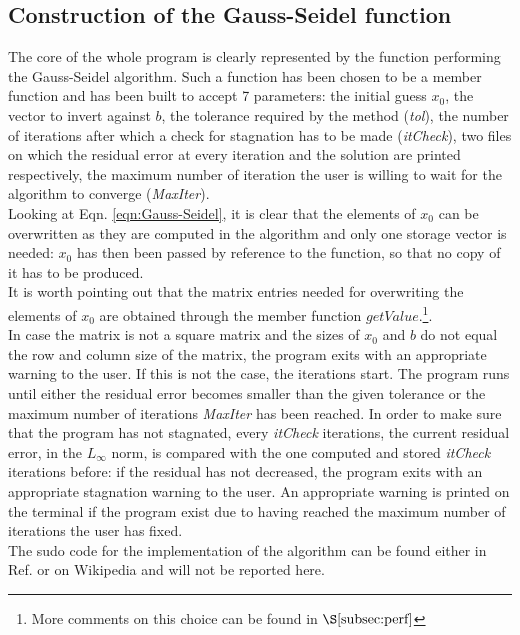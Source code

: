 \documentclass{article}
\theoremstyle{theorem}
\theoremstyle{definition}
\begin{document}
\subsection{Construction of the Gauss-Seidel function}
The core of the whole program is clearly represented by the function performing the Gauss-Seidel algorithm. Such a function has been chosen to be a member function and has been built to accept 7 parameters: the initial guess $x_0$, the vector to invert against $b$, the tolerance required by the method (\emph{tol}), the number of iterations after which a check for stagnation has to be made (\emph{itCheck}), two files on which the residual error at every iteration and the solution are printed respectively, the maximum number of iteration the user is willing to wait for the algorithm to converge (\emph{MaxIter}).\\
Looking at Eqn. \eqref{eqn:Gauss-Seidel}, it is clear that the elements of $x_0$ can be overwritten as they are computed in the algorithm and only one storage vector is needed: $x_0$ has then been passed by reference to the function, so that no copy of it has to be produced.\\
It is worth pointing out that the matrix entries needed for overwriting the elements of $x_0$ are obtained through the member function $getValue$.\footnote{More comments on this choice can be found in $\S\ref{subsec:perf}$}.\\  
In case the matrix is not a square matrix and the sizes of $x_0$ and $b$ do not equal the row and column size of the matrix, the program exits with an appropriate warning to the user. If this is not the case, the iterations start. The program runs until either the residual error becomes smaller than the given tolerance or the maximum number of iterations \emph{MaxIter} has been reached. In order to make sure that the program has not stagnated, every \emph{itCheck} iterations, the current residual error, in the $L_\infty$ norm, is compared with the one computed and stored \emph{itCheck} iterations before: if the residual has not decreased, the program exits with an appropriate stagnation warning to the user. An appropriate warning is printed on the terminal if the program exist due to having reached the maximum number of iterations the user has fixed.\\
The sudo code for the implementation of the algorithm can be found either in Ref.\cite{lec-notes} or on Wikipedia and will not be reported here. 
\end{document}

